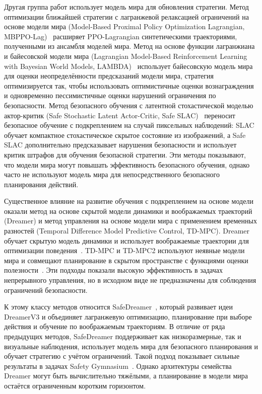 Другая группа работ использует модель мира для обновления стратегии. Метод оптимизации ближайшей стратегии с лагранжевой релаксацией ограничений на основе модели мира (Model-Based Proximal Policy Optimization Lagrangian, MBPPO-Lag)~\cite{jayant2022model} расширяет PPO-Lagrangian синтетическими траекториями, полученными из ансамбля моделей мира. Метод на основе функции лагранжиана и байесовской модели мира (Lagrangian Model-Based Reinforcement Learning with Bayesian World Models, LAMBDA)~\cite{as2022lambda} использует байесовскую модель мира для оценки неопределённости предсказаний модели мира, стратегия оптимизируется так, чтобы использовать оптимистичные оценки вознаграждения и одновременно пессимистичные оценки нарушений ограничения по безопасности. Метод безопасного обучения с латентной стохастической моделью актор-критик (Safe Stochastic Latent Actor-Critic, Safe SLAC)~\cite{hogewind2022safe} переносит безопасное обучение с подкреплением на случай пиксельных наблюдений: SLAC обучает компактное стохастическое скрытое состояние из изображений, а Safe SLAC дополнительно предсказывает нарушения безопасности и использует критик штрафов для обучения безопасной стратегии. Эти методы показывают, что модели мира могут повышать эффективность безопасного обучения, однако часто не используют модель мира для непосредственного безопасного планирования действий.

Существенное влияние на развитие обучения с подкреплением на основе модели оказали метод на основе скрытой модели динамики и воображаемых траекторий (Dreamer) и метод управления на основе модели мира с применением временных разностей (Temporal Difference Model Predictive Control, TD-MPC). Dreamer обучает скрытую модель динамики и использует воображаемые траектории для оптимизации поведения~\cite{hafner2019dreamer,hafner2023dreamerv3}. TD-MPC и TD-MPC2 используют неявные модели мира и совмещают планирование в скрытом пространстве с функциями оценки полезности~\cite{hansen2022tdmpc,hansen2024tdmpc2}. Эти подходы показали высокую эффективность в задачах непрерывного управления, но в исходном виде не предназначены для соблюдения ограничений безопасности.

К этому классу методов относится SafeDreamer~\cite{safedreamer}, который развивает идеи DreamerV3 и объединяет лагранжевую оптимизацию, планирование при выборе действия и обучение по воображаемым траекториям. В отличие от ряда предыдущих методов, SafeDreamer поддерживает как низкоразмерные, так и визуальные наблюдения, использует модель мира для безопасного планирования и обучает стратегию с учётом ограничений. Такой подход показывает сильные результаты в задачах Safety Gymnasium~\cite{ji2023safetygymnasium}. Однако архитектуры семейства Dreamer могут быть вычислительно тяжёлыми, а планирование в модели мира остаётся ограниченным коротким горизонтом.

